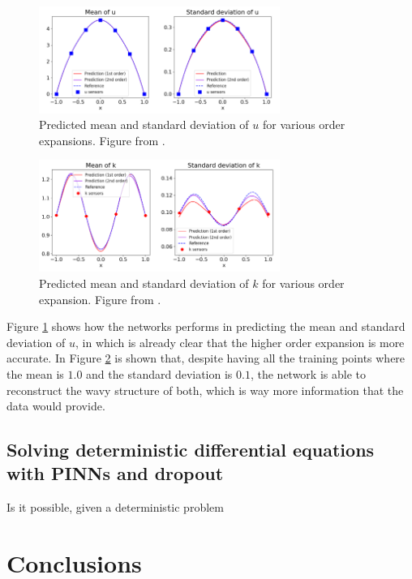 \documentclass[11pt,a4paper]{article}
\begin{document}
\begin{figure}[H]
    \centering 
    \includegraphics[width=0.7\textwidth]{Images/Mean_STD_2ndorder.png}
    \captionsetup{justification=centering,margin=1cm}
    \caption{Predicted mean and standard deviation of \(u\) for various order expansions. Figure from \cite{Zhang_2019}.}
    \label{fig:mean_u}
\end{figure}
\begin{figure}[H]
    \centering 
    \includegraphics[width=0.7\textwidth]{Images/Mean_STD_k.png}
    \captionsetup{justification=centering,margin=1cm}
    \caption{Predicted mean and standard deviation of \(k\) for various order expansion. Figure from \cite{Zhang_2019}.}
    \label{fig:mean_k}
\end{figure}
Figure \ref{fig:mean_u} shows how the networks performs in predicting the mean and standard deviation of \(u\), in which is already clear that the higher order expansion is more accurate. In Figure \ref{fig:mean_k} is shown that, despite having all the training points where the mean is \(1.0\) and the standard deviation is \(0.1\), the network is able to reconstruct the wavy structure of both, which is way more information that the data would provide.

\subsection{Solving deterministic differential equations with PINNs and dropout}

Is it possible, given a deterministic problem
\section{Conclusions}

\end{document}

